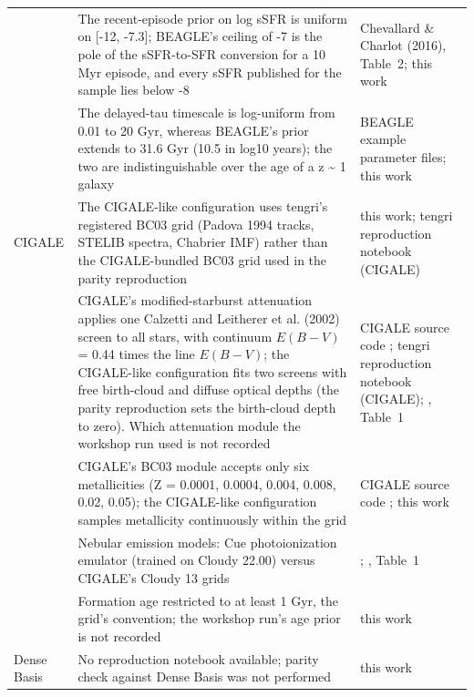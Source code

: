\begin{table}[!t]
\begin{tabular}{@{}lll@{}}
 & \parbox[t]{9.6cm}{\raggedright The recent-episode prior on log sSFR is uniform on [-12, -7.3]; BEAGLE's ceiling of -7 is the pole of the sSFR-to-SFR conversion for a 10 Myr episode, and every sSFR published for the sample lies below -8} & \parbox[t]{4.6cm}{\raggedright Chevallard \& Charlot (2016), Table~2; this work} \\
 & \parbox[t]{9.6cm}{\raggedright The delayed-tau timescale is log-uniform from 0.01 to 20 Gyr, whereas BEAGLE's prior extends to 31.6 Gyr (10.5 in log10 years); the two are indistinguishable over the age of a z \textasciitilde{} 1 galaxy} & \parbox[t]{4.6cm}{\raggedright BEAGLE example parameter files; this work} \\
\midrule
CIGALE & \parbox[t]{9.6cm}{\raggedright The CIGALE-like configuration uses tengri's registered BC03 grid (Padova 1994 tracks, STELIB spectra, Chabrier IMF) rather than the CIGALE-bundled BC03 grid used in the parity reproduction} & \parbox[t]{4.6cm}{\raggedright this work; tengri reproduction notebook (CIGALE)} \\
 & \parbox[t]{9.6cm}{\raggedright CIGALE's modified-starburst attenuation applies one Calzetti and Leitherer et al. (2002) screen to all stars, with continuum $E(B{-}V)$ = 0.44 times the line $E(B{-}V)$; the CIGALE-like configuration fits two screens with free birth-cloud and diffuse optical depths (the parity reproduction sets the birth-cloud depth to zero). Which attenuation module the workshop run used is not recorded} & \parbox[t]{4.6cm}{\raggedright CIGALE source code \citep{Boquien_2019}; tengri reproduction notebook (CIGALE); \citet{Pacifici_2023}, Table~1} \\
 & \parbox[t]{9.6cm}{\raggedright CIGALE's BC03 module accepts only six metallicities (Z = 0.0001, 0.0004, 0.004, 0.008, 0.02, 0.05); the CIGALE-like configuration samples metallicity continuously within the grid} & \parbox[t]{4.6cm}{\raggedright CIGALE source code \citep{Boquien_2019}; this work} \\
 & \parbox[t]{9.6cm}{\raggedright Nebular emission models: Cue photoionization emulator (trained on Cloudy 22.00) versus CIGALE's Cloudy 13 grids} & \parbox[t]{4.6cm}{\raggedright \citet{Li_2025}; \citet{Pacifici_2023}, Table~1} \\
 & \parbox[t]{9.6cm}{\raggedright Formation age restricted to at least 1 Gyr, the grid's convention; the workshop run's age prior is not recorded} & \parbox[t]{4.6cm}{\raggedright this work} \\
\midrule
Dense Basis & \parbox[t]{9.6cm}{\raggedright No reproduction notebook available; parity check against Dense Basis was not performed} & \parbox[t]{4.6cm}{\raggedright this work} \\

\end{tabular}
\end{table}
